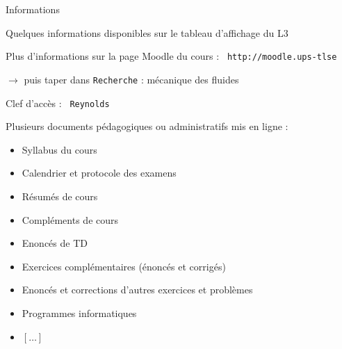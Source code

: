 \begin{frame}{Informations}

\small

Quelques informations disponibles sur le tableau d'affichage du L3

\medskip

Plus d'informations sur la page Moodle du cours : \quad \texttt{\color{rouge} http://moodle.ups-tlse} 

\medskip

\qquad $\rightarrow$ puis taper dans \texttt{Recherche} : mécanique des fluides

\medskip

Clef d'accès : \texttt{\color{rouge} Reynolds}

\pause

\bigskip

Plusieurs documents pédagogiques ou administratifs mis en ligne :

\begin{itemize}
\item
	Syllabus du cours
\item
	Calendrier et protocole des examens
\item
	Résumés de cours
\item
	Compléments de cours
\item
	Enoncés de TD
\item
	\textcolor{rouge}{Exercices complémentaires} (énoncés et corrigés)
\item
	Enoncés et corrections d'autres exercices et problèmes 
\item
	Programmes informatiques
\item
 	 $[\ldots]$
\end{itemize}

\vspace{5mm}

\end{frame}


